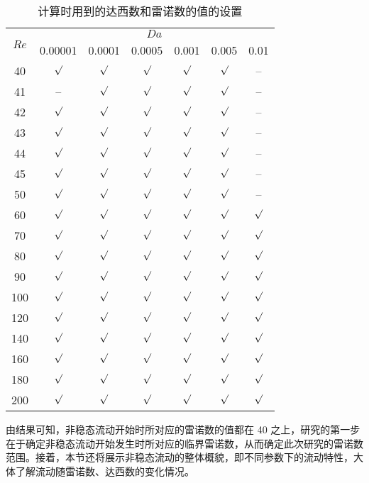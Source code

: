 \begin{table}
	\caption{计算时用到的达西数和雷诺数的值的设置}\label{tab: DaRe}
	\vspace{.5em}\centering\wuhao
	\begin{tabular}{*{7}{c}}
		\toprule[1.5pt]
		\multirow{2}[3]{*}{$Re$} & \multicolumn{6}{c}{$Da$} \\
		\cmidrule[.67pt](lr){2-7}
		& 0.00001 & 0.0001 & 0.0005 & 0.001 & 0.005 & 0.01 \\
		\midrule[1pt]
		40  & $\surd$ & $\surd$ & $\surd$ & $\surd$ & $\surd$ & -- \\
		41  & --      & $\surd$ & $\surd$ & $\surd$ & $\surd$ & -- \\
		42  & $\surd$ & $\surd$ & $\surd$ & $\surd$ & $\surd$ & -- \\
		43  & $\surd$ & $\surd$ & $\surd$ & $\surd$ & $\surd$ & -- \\
		44  & $\surd$ & $\surd$ & $\surd$ & $\surd$ & $\surd$ & -- \\
		45  & $\surd$ & $\surd$ & $\surd$ & $\surd$ & $\surd$ & -- \\
		50  & $\surd$ & $\surd$ & $\surd$ & $\surd$ & $\surd$ & -- \\
		60  & $\surd$ & $\surd$ & $\surd$ & $\surd$ & $\surd$ & $\surd$ \\
		70  & $\surd$ & $\surd$ & $\surd$ & $\surd$ & $\surd$ & $\surd$ \\
		80  & $\surd$ & $\surd$ & $\surd$ & $\surd$ & $\surd$ & $\surd$ \\
		90  & $\surd$ & $\surd$ & $\surd$ & $\surd$ & $\surd$ & $\surd$ \\
		100 & $\surd$ & $\surd$ & $\surd$ & $\surd$ & $\surd$ & $\surd$ \\
		120 & $\surd$ & $\surd$ & $\surd$ & $\surd$ & $\surd$ & $\surd$ \\
		140 & $\surd$ & $\surd$ & $\surd$ & $\surd$ & $\surd$ & $\surd$ \\
		160 & $\surd$ & $\surd$ & $\surd$ & $\surd$ & $\surd$ & $\surd$ \\
		180 & $\surd$ & $\surd$ & $\surd$ & $\surd$ & $\surd$ & $\surd$ \\
		200 & $\surd$ & $\surd$ & $\surd$ & $\surd$ & $\surd$ & $\surd$ \\
		\bottomrule[1.5pt]
	\end{tabular}
\end{table}

由结果可知，非稳态流动开始时所对应的雷诺数的值都在 40 之上，研究的第一步在于确定非稳态流动开始发生时所对应的临界雷诺数，从而确定此次研究的雷诺数范围。接着，本节还将展示非稳态流动的整体概貌，即不同参数下的流动特性，大体了解流动随雷诺数、达西数的变化情况。


